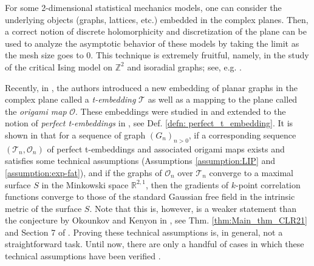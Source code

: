 \documentclass[12pt]{amsart}
\newcommand{\Z}{{\mathbb Z}}
\numberwithin{equation}{section}
\theoremstyle{definition}
\begin{document}
For some 2-dimensional statistical mechanics models, one can consider the underlying objects (graphs, lattices, etc.) embedded in the complex planes. Then, a correct notion of discrete holomorphicity and discretization of the plane can be used to analyze the asymptotic behavior of these models by taking the limit as the mesh size goes to 0. This technique is extremely fruitful, namely, in the study of the critical Ising model on $\Z^2$ and isoradial graphs; see, e.g. \cite{CS11,CS12,HS13,CHI15,Smi06,Smir10,Smir10ICM}. 

Recently, in \cite{circle_pattern,MR4588721}, the authors introduced a new embedding of planar graphs in the complex plane called a \emph{t-embedding} $\mathcal{T}$ as well as a mapping to the plane called the \emph{origami map} $\mathcal{O}$. These embeddings were studied in \cite{MR4588721} and extended to the notion of \emph{perfect t-embeddings} in \cite{chelkak2021bipartitedimermodelperfect}, see Def. \ref{defn: perfect_t_embedding}. It is shown in \cite{chelkak2021bipartitedimermodelperfect,MR4588721} that for a sequence of graph $(G_n)_{n>0}$, if a corresponding sequence $\left(\mathcal{T}_n, \mathcal{O}_n\right)$ of perfect t-embeddings and associated origami maps exists and satisfies some technical assumptions (Assumptions \ref{assumption:LIP} and \ref{assumption:exp-fat}), and if the graphs of $\mathcal{O}_n$ over $\mathcal{T}_n$ converge to a maximal surface $S$ in the Minkowski space $\mathbb{R}^{2,1}$, then the gradients of $k$-point correlation functions converge to those of the standard Gaussian free field in the intrinsic metric of the surface $S$. Note that this is, however, is a weaker statement than the conjecture by Okounkov and Kenyon in \cite{OK1}, see Thm. \ref{thm:Main_thm_CLR21} and Section 7 of \cite{MR4588721}. Proving these technical assumptions is, in general, not a straightforward task. Until now, there are only a handful of cases in which these technical assumptions have been verified \cite{tower_AD_perfect, berggren2024perfecttembeddingslozengetilings,berggren2025perfecttembeddingsdoublyperiodic,berggren2025perfecttembeddingsoctahedronequation}. 
\end{document}

